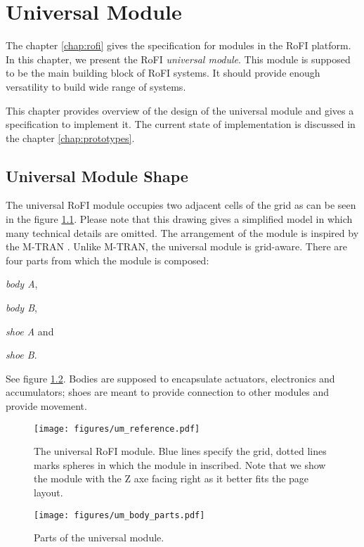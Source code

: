 \chapter{Universal Module}\label{chap:universal_module}

The chapter \ref{chap:rofi} gives the specification for modules in the RoFI
platform. In this chapter, we present the RoFI \emph{universal module}. This
module is supposed to be the main building block of RoFI systems. It should
provide enough versatility to build wide range of systems.

This chapter provides overview of the design of the universal module and gives a
specification to implement it. The current state of implementation is discussed
in the chapter \ref{chap:prototypes}.

\section{Universal Module Shape}

The universal RoFI module occupies two adjacent cells of the grid as can be seen
in the figure \ref{fig:um_reference}. Please note that this drawing gives a
simplified model in which many technical details are omitted. The arrangement of
the module is inspired by the M-TRAN \cite{kurokawa_distributed_2008}. Unlike
M-TRAN, the universal module is grid-aware. There are four parts from which the
module is composed:
\begin{enumerate*}
    \item \emph{body A},
    \item \emph{body B},
    \item \emph{shoe A} and
    \item \emph{shoe B}.
\end{enumerate*}
See figure \ref{fig:um_body_parts}. Bodies are supposed to encapsulate
actuators, electronics and accumulators; shoes are meant to provide connection
to other modules and provide movement.

\begin{figure}[t]
    \centering
    \texttt{[image: figures/um\_reference.pdf]}
    \caption{The universal RoFI module. Blue lines specify the grid, dotted
    lines marks spheres in which the module in inscribed. Note that we show the
    module with the Z axe facing right as it better fits  the page layout. }
    \label{fig:um_reference}
\end{figure}

\begin{figure}[t]
    \centering
    \texttt{[image: figures/um\_body\_parts.pdf]}
    \caption{Parts of the universal module.}
    \label{fig:um_body_parts}
\end{figure}

